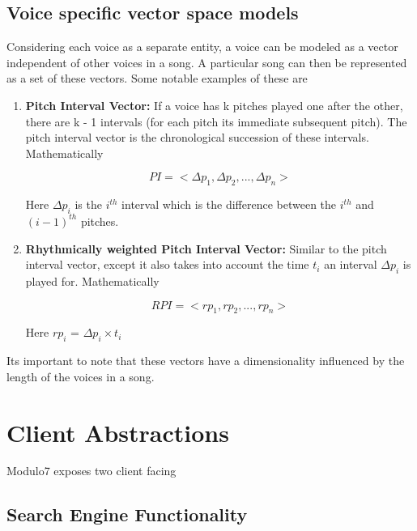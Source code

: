 \documentclass{article}
\begin{document}
\subsection{Voice specific vector space models} \label{voicespecificvectorspace}
 
Considering each voice as a separate entity, a voice can be modeled as a vector independent of other voices in a song. A particular song can then be represented as a set of these vectors. Some notable examples of these are 

\begin{enumerate}
\item \textbf{Pitch Interval Vector:} If a voice has k pitches played one after the other, there are  k - 1 intervals (for each pitch its immediate subsequent pitch). The pitch interval vector is the chronological succession of these intervals. Mathematically 

\begin{equation}
PI = <\Delta p_1, \Delta p_2, ... , \Delta p_n>
\end{equation}

Here $\Delta p_i$ is the $i^{th}$ interval which is the difference between the $i^{th}$ and $(i - 1)^{th}$ pitches. 

\item \textbf{Rhythmically weighted Pitch Interval Vector:} Similar to the pitch interval vector, except it also takes into account the time $t_i$ an interval $\Delta p_i$ is played for. Mathematically

\begin{equation}
RPI = <rp_1, rp_2, ... , rp_n>
\end{equation}

Here $rp_i$ = $\Delta p_i \times t_i$

\end{enumerate}

\noindent Its important to note that these vectors have a dimensionality influenced by the length of the voices in a song. 
 
\section{Client Abstractions} 

Modulo7 exposes two client facing  

\subsection{Search Engine Functionality} \label{searchengine}
\end{document}
